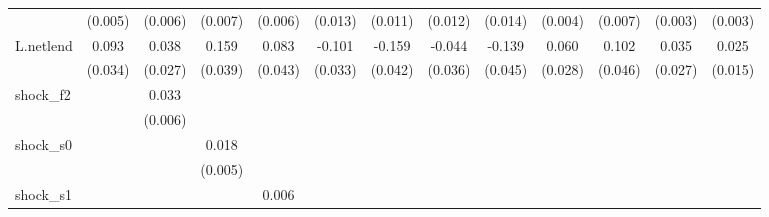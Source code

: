 {\begin{tabular}{l*{12}{c}}
            &     (0.005)         &     (0.006)         &     (0.007)         &     (0.006)         &     (0.013)         &     (0.011)         &     (0.012)         &     (0.014)         &     (0.004)         &     (0.007)         &     (0.003)         &     (0.003)         \\
\addlinespace
L.netlend   &       0.093\sym{**} &       0.038         &       0.159\sym{***}&       0.083\sym{*}  &      -0.101\sym{***}&      -0.159\sym{***}&      -0.044         &      -0.139\sym{***}&       0.060\sym{**} &       0.102\sym{**} &       0.035         &       0.025         \\
            &     (0.034)         &     (0.027)         &     (0.039)         &     (0.043)         &     (0.033)         &     (0.042)         &     (0.036)         &     (0.045)         &     (0.028)         &     (0.046)         &     (0.027)         &     (0.015)         \\
\addlinespace
shock\_f2    &                     &       0.033\sym{***}&                     &                     &                     &                     &                     &                     &                     &                     &                     &                     \\
            &                     &     (0.006)         &                     &                     &                     &                     &                     &                     &                     &                     &                     &                     \\
\addlinespace
shock\_s0    &                     &                     &       0.018\sym{***}&                     &                     &                     &                     &                     &                     &                     &                     &                     \\
            &                     &                     &     (0.005)         &                     &                     &                     &                     &                     &                     &                     &                     &                     \\
\addlinespace
shock\_s1    &                     &                     &                     &       0.006\sym{*}  &                     &                     &                     &                     &                     &                     &                     &                     \\

\end{tabular}}
